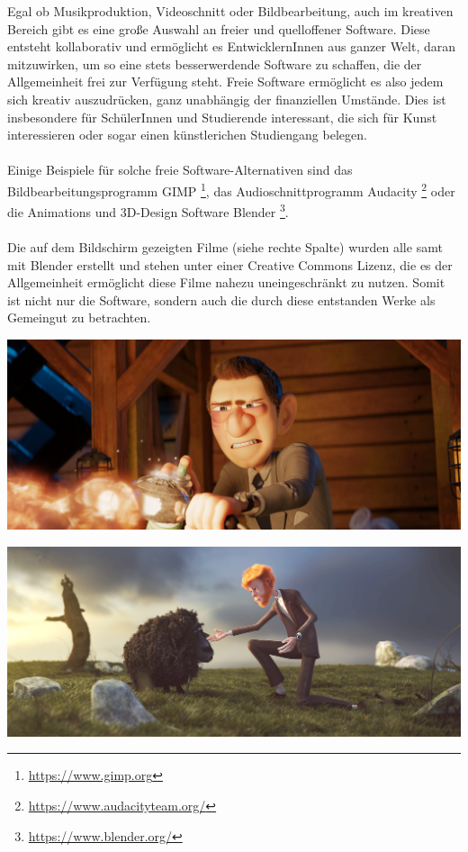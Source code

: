 \documentclass[a0,portrait]{a0poster}
\begin{document}
\vspace{1cm}
\begin{multicols}{2}
\huge Egal ob Musikproduktion, Videoschnitt oder Bildbearbeitung, auch im kreativen Bereich gibt es eine große Auswahl an freier und quelloffener Software. Diese entsteht kollaborativ und ermöglicht es EntwicklernInnen aus ganzer Welt, daran mitzuwirken, um so eine stets besserwerdende Software zu schaffen, die der Allgemeinheit frei zur Verfügung steht. Freie Software ermöglicht es also jedem sich kreativ auszudrücken, ganz unabhängig der finanziellen Umstände. Dies ist insbesondere für SchülerInnen und Studierende interessant, die sich für Kunst interessieren oder sogar einen künstlerichen Studiengang belegen.\\\\
Einige Beispiele für solche freie Software-Alternativen sind das Bildbearbeitungsprogramm GIMP \footnote{\Large\url{https://www.gimp.org}}, das Audioschnittprogramm Audacity \footnote{\Large\url{https://www.audacityteam.org/}} oder die Animations und 3D-Design Software Blender \footnote{\Large\url{https://www.blender.org/}}.\\\\
Die auf dem Bildschirm gezeigten Filme (siehe rechte Spalte) wurden alle samt mit Blender erstellt und stehen unter einer Creative Commons Lizenz, die es der Allgemeinheit ermöglicht diese Filme nahezu uneingeschränkt zu nutzen. Somit ist nicht nur die Software, sondern auch die durch diese entstanden Werke als Gemeingut zu betrachten.

\columnbreak

\includegraphics[scale=0.5]{figures/a327_barbershop_04861.png}
\vspace*{2cm}

\includegraphics[scale=0.51]{figures/gooseberry_benchmark_01.jpg}
\vspace*{2cm}


\end{multicols}
\end{document}
